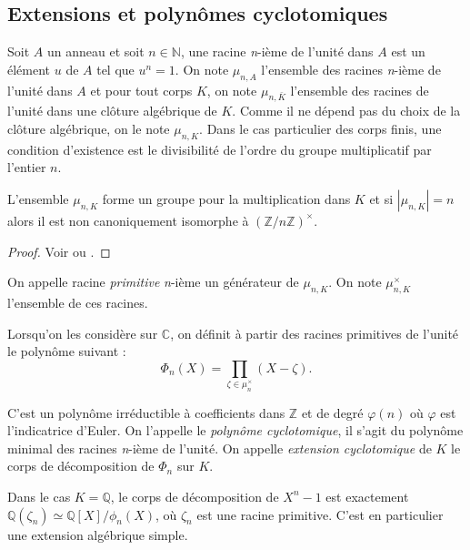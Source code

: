 \documentclass[a4paper]{article} %
\numberwithin{section}{part}
\numberwithin{equation}{section}
\newcommand\nroot[1]{\textit{#1}-ième}
\newcommand\zmodninv[1]{(\mathbb{Z}/#1\mathbb{Z})^{\times}}
\newcommand\QQ{\mathbb{Q}}
\newcommand\ZZ{\mathbb{Z}}
\newcommand\NN{\mathbb{N}}
\newcommand\CC{\mathbb{C}}
\begin{document}
\subsection{Extensions et polynômes cyclotomiques}
Soit $A$ un anneau et soit $n\in\NN$, une racine \nroot{n} de l'unité dans $A$ 
est un élément $u$ de $A$ tel que $u^n = 1$. On note $\mu_{n,A}$ l'ensemble des 
racines \nroot{n} de l'unité dans $A$ et pour tout corps $K$, on note 
$\mu_{n,\bar{K}}$ l'ensemble des racines de l'unité dans une clôture algébrique 
de $K$. Comme il ne dépend pas du choix de la clôture algébrique, on le note 
$\mu_{n,K}$. Dans le cas particulier des corps finis, une condition d'existence 
est le divisibilité de l'ordre du groupe multiplicatif par l'entier $n$.\par

\begin{prop}
\label{prop:rootcycl}
L'ensemble $\mu_{n,K}$ forme un groupe pour la multiplication dans $K$ et si 
$|\mu_{n,K}| = n$ alors il est non canoniquement isomorphe à $\zmodninv{n}$.
\end{prop}
\begin{proof}
Voir \cite[p. 28, th. 1]{Sam} ou \cite[qqch]{Lan1}.
\end{proof}

\begin{defn}
On appelle racine \emph{primitive} \nroot{n} un générateur de $\mu_{n,K}$. On 
note $\mu_{n,K}^{\times}$ l'ensemble de ces racines.
\end{defn}

Lorsqu'on les considère sur $\CC$, on définit à partir des racines primitives de
l'unité le polynôme suivant :
\begin{equation}
\Phi_n(X) = \prod_{\zeta\in \mu_n^{\times}}{(X - \zeta)}.
\end{equation}

C'est un polynôme irréductible à coefficients dans $\ZZ$ \cite[prop 4.8]{Per}et 
de degré $\varphi(n)$ où $\varphi$ est l'indicatrice d'Euler. On l'appelle 
le \emph{polynôme cyclotomique}, il s'agit du polynôme minimal des racines
\nroot{n} de l'unité. On appelle \emph{extension cyclotomique} de $K$ le corps
de décomposition de $\Phi_n$ sur $K$.

\begin{rem}
Dans le cas $K = \QQ$, le corps de décomposition de $X^n - 1$ est exactement 
$\QQ(\zeta_n) \simeq \QQ[X]/\phi_n(X)$, où $\zeta_n$ est une racine primitive. 
C'est en particulier une extension algébrique simple.
\end{rem}
\end{document}
